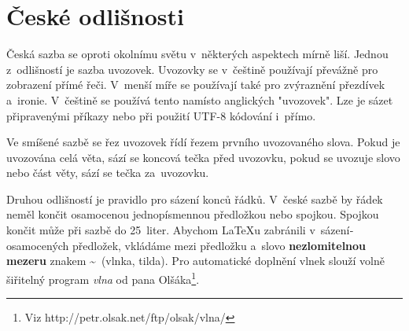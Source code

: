 \documentclass[a4paper,twocolumn,11pt]{article}
\begin{document}
\section{České odlišnosti} 

Česká sazba se oproti okolní­mu světu v~některých aspektech mí­rně liší­. Jednou z~odlišností je sazba uvozovek. Uvozovky se v~češtině použí­vají­ převážně pro zobrazení­ pří­mé řeči. V~menší­ míře se použí­vají­ také pro zvýraznění­ přezdí­vek a~ironie. V~češtině se použí­vá tento \textbf{} namí­sto anglických "uvozovek". Lze je sázet připravenými příkazy nebo při použití UTF-8 kódování i~přímo.
\par Ve smíšené sazbě se řez uvozovek ří­dí­ řezem první­ho uvozovaného slova. Pokud je uvozována celá věta, sází­ se koncová tečka před uvozovku, pokud se uvozuje slovo nebo část věty, sází­ se tečka za~uvozovku.
\par Druhou odlišností je pravidlo pro sázení­ konců řádků. V~české sazbě by řádek neměl končit osamocenou jednopí­smennou předložkou nebo spojkou. Spojkou  končit může při sazbě do 25~liter. Abychom \LaTeX u zabránili v~sázení­ osamocených předložek, vkládáme mezi předložku a~slovo \textbf{nezlomitelnou mezeru} znakem \textasciitilde \ (vlnka, tilda). Pro automatické doplnění vlnek slouží­ volně šiřitelný program \emph{vlna} od pana Olšáka\footnote{Viz http://petr.olsak.net/ftp/olsak/vlna/}.
\end{document}
